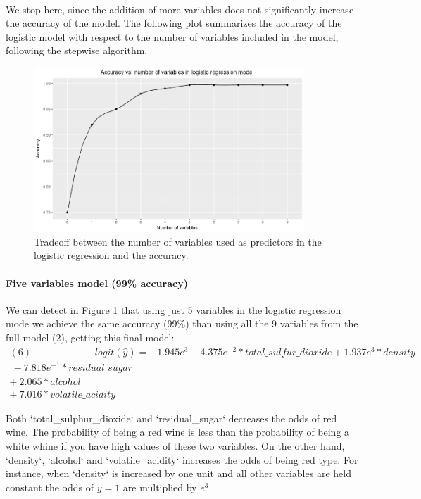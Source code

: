 \documentclass[10pt]{article}
\begin{document}
\paragraph*{}
We stop here, since the addition of more variables does not significantly increase the accuracy of the model. The following plot summarizes the accuracy of the logistic model with respect to the number of variables included in the model, following the stepwise algorithm.


\begin{figure}[H]
	\centering
	\includegraphics[width=4in]{figures/accuracy-model.png} 
	\caption{Tradeoff between the number of variables used as predictors in the logistic regression and the accuracy.}
	\label{figure:accuracy-model}
\end{figure}

\paragraph{Five variables model (99\% accuracy)}
We can detect in Figure \ref{figure:accuracy-model} that using just 5 variables in the logistic regression mode we achieve the same accuracy (99\%) than using all the 9 variables from the full model (2), getting this final model:
\begin{equation*}
\begin{aligned}	
(6) \ \ \ \ \ \ \ \ \ \ \ \ \ \  \ \ \ \ \ \ \ \ \ \ \ \ \ \  \   logit(\hat{y}) = -1.945e^{3}  -4.375e^{-2}*total\_sulfur\_dioxide + 1.937e^{3}*density \\ \  -7.818e^{-1}*residual\_sugar \\  + \ 2.065*alcohol \\ + \ 7.016*volatile\_acidity
\end{aligned}
\end{equation*}	

Both `total\_sulphur\_dioxide` and `residual\_sugar` decreases the odds of red wine. The probability of being a red wine is less than the probability of being a white whine if you have high values of these two variables. On the other hand, `density`, `alcohol` and `volatile\_acidity` increases the odds of being red type. For instance, when `density` is increased by one unit and all other variables are held constant the odds of $y = 1$ are multiplied by $e^{3}$.
\end{document}
